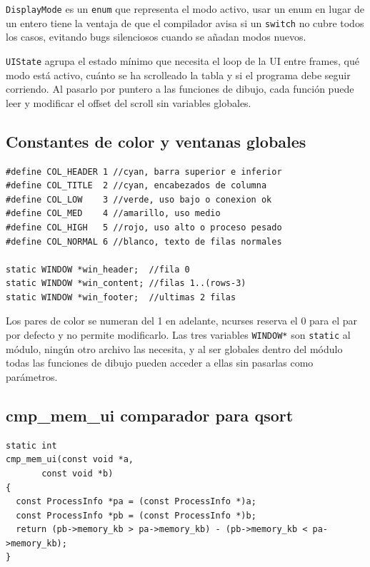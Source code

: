 \documentclass[12pt,letterpaper]{article}
\begin{document}
\texttt{DisplayMode} es un \texttt{enum} que representa el modo activo, usar un enum en lugar de un entero
tiene la ventaja de que el compilador avisa si un \texttt{switch} no cubre todos los casos, evitando bugs
silenciosos cuando se añadan modos nuevos.

\medskip

\texttt{UIState} agrupa el estado mínimo que necesita el loop de la UI entre frames, qué modo está activo,
cuánto se ha scrolleado la tabla y si el programa debe seguir corriendo. Al pasarlo por puntero a las funciones
de dibujo, cada función puede leer y modificar el offset del scroll sin variables globales.

\subsection*{Constantes de color y ventanas globales}

\begin{lstlisting}[style=modernc, caption={\texttt{ui.c} constantes y ventanas}]
#define COL_HEADER 1 //cyan, barra superior e inferior
#define COL_TITLE  2 //cyan, encabezados de columna
#define COL_LOW    3 //verde, uso bajo o conexion ok
#define COL_MED    4 //amarillo, uso medio
#define COL_HIGH   5 //rojo, uso alto o proceso pesado
#define COL_NORMAL 6 //blanco, texto de filas normales

static WINDOW *win_header;  //fila 0
static WINDOW *win_content; //filas 1..(rows-3)
static WINDOW *win_footer;  //ultimas 2 filas
\end{lstlisting}

Los pares de color se numeran del 1 en adelante, ncurses reserva el 0 para el par por defecto y no permite
modificarlo. Las tres variables \texttt{WINDOW*} son \texttt{static} al módulo, ningún otro archivo las
necesita, y al ser globales dentro del módulo todas las funciones de dibujo pueden acceder a ellas sin
pasarlas como parámetros.

\subsection*{cmp\_mem\_ui comparador para qsort}

\begin{lstlisting}[style=modernc, caption={\texttt{ui.c} cmp\_mem\_ui()}]
static int
cmp_mem_ui(const void *a,
	   const void *b)
{
  const ProcessInfo *pa = (const ProcessInfo *)a;
  const ProcessInfo *pb = (const ProcessInfo *)b;
  return (pb->memory_kb > pa->memory_kb) - (pb->memory_kb < pa->memory_kb);
}
\end{lstlisting}
\end{document}
